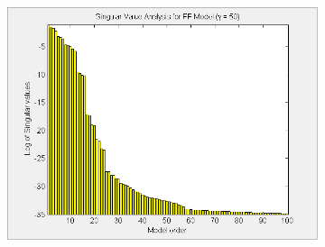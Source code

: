 \begin{landscape}
\begin{figure}[H]
\begin{subfigure}[b]{0.4\textwidth}
\includegraphics[width=1.0\textwidth]{pics/SVD_FF_50}
\caption{}
\label{pic:}
\end{subfigure}
\end{figure}

 \end{landscape}

















%

%
%
%

%
%
%
 
 

